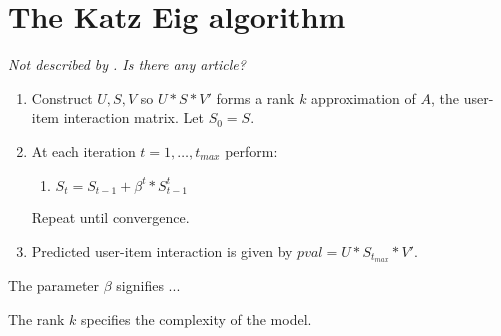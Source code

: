 \section{The Katz Eig algorithm}\label{sec:katzeig}

\textit{Not described by \cite{shin2012multi}. Is there any article?}

\begin{enumerate}
    \item Construct $U, S, V$ so $U * S * V'$ forms a rank $k$ approximation of $A$, the user-item interaction matrix. Let $S_0 = S$.

    \item At each iteration $t = 1, \ldots, t_{max}$ perform:

        \begin{enumerate}
            \item $S_t = S_{t - 1} + \beta^t * S_{t - 1}^t$
        \end{enumerate}

        Repeat until convergence.

    \item Predicted user-item interaction is given by $\mathit{pval} = U * S_{t_{max}} * V'$.

\end{enumerate}

The parameter $\beta$ signifies ...

The rank $k$ specifies the complexity of the model.

